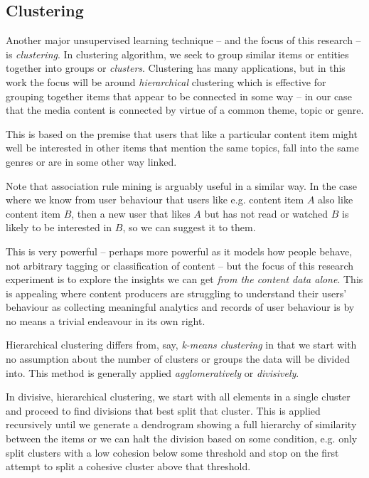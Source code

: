 \subsection{Clustering}

Another major unsupervised learning technique -- and the focus of
this research -- is \emph{clustering}. In clustering algorithm, we
seek to group similar items or entities together into groups or
\emph{clusters}. Clustering has many applications, but in this
work the focus will be around \emph{hierarchical} clustering which
is effective for grouping together items that appear to be
connected in some way -- in our case that the media content is
connected by virtue of a common theme, topic or genre.

This is based on the premise that users that like a particular
content item might well be interested in other items that mention
the same topics, fall into the same genres or are in some other
way linked.

Note that association rule mining is arguably useful in a similar way.
In the case where we know from user behaviour that users like e.g.
content item $A$ also like content item $B$, then a new user that
likes $A$ but has not read or watched $B$ is likely to be interested
in $B$, so we can suggest it to them.

This is very powerful -- perhaps more powerful as it models how
people behave, not arbitrary tagging or classification of content --
but the focus of this research experiment is to explore the insights
we can get \emph{from the content data alone}. This is appealing
where content producers are struggling to understand their users'
behaviour as collecting meaningful analytics and records of user
behaviour is by no means a trivial endeavour in its own right.

Hierarchical clustering differs from, say,
\emph{k-means clustering}\cite{witten2005data} in that
we start with no assumption about the number of clusters or groups
the data will be divided into. This method is generally applied
\emph{agglomeratively} or \emph{divisively}.

In divisive, hierarchical clustering, we start with all elements in
a single cluster and proceed to find divisions that best split that
cluster. This is applied recursively until we generate a
dendrogram\cite{witten2005data} showing a full hierarchy of similarity
between the items or we can halt the division based on some condition,
e.g. only split clusters with a low cohesion below some threshold
and stop on the first attempt to split a cohesive cluster above
that threshold.

